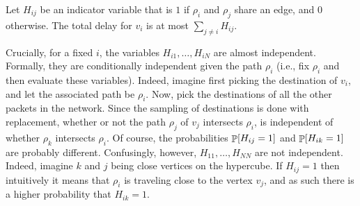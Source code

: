 
Let $H_{i j}$ be an indicator variable that is $1$ if $\rho_i$ and
$\rho_j$ share an edge, and $0$ otherwise. The total delay for $v_i$
is at most $\sum_{j \neq i} H_{i j}$.

Crucially, for a fixed $i$, the variables $H_{i1}, \ldots, H_{i N}$ are almost
independent. Formally, they are conditionally independent given the path
$\rho_i$ (i.e., fix $\rho_i$ and then evaluate these variables).  Indeed,
imagine first picking the destination of $v_i$, and let the associated
path be $\rho_i$. Now, pick the destinations of all the other packets in the
network. Since the sampling of destinations is done with replacement,
whether or not the path $\rho_j$ of $v_j$ intersects $\rho_i$, is independent
of whether $\rho_k$ intersects $\rho_i$. Of course, the probabilities
$\Prob{ \smash{H_{ij} = 1}}$ and $\Prob{ H_{ik} = 1}$ are probably
different.  Confusingly, however, $H_{11}, \ldots, H_{N{} N}$ are not
independent. Indeed, imagine $k$ and $j$ being close vertices on the
hypercube. If $H_{ij} =1$ then intuitively it means that $\rho_i$ is
traveling close to the vertex $v_j$, and as such there is a higher
probability that $H_{ik}=1$.


